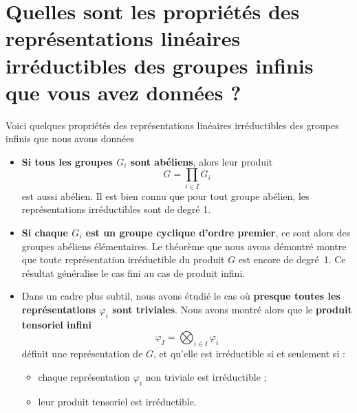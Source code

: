\documentclass[a4paper, 14pt]{report}
\begin{document}
\section{Quelles sont les propriétés des représentations linéaires irréductibles des groupes infinis que vous avez données ?}
Voici quelques propriétés des représentations linéaires irréductibles des groupes infinis que nous avons données
\begin{itemize}
	\item \textbf{Si tous les groupes \( G_i \) sont abéliens}, alors leur produit
	\[
	G = \prod_{i \in I} G_i
	\]
	est aussi abélien. Il est bien connu que pour tout groupe abélien, les représentations irréductibles sont de degré 1.
	
	\item \textbf{Si chaque \( G_i \) est un groupe cyclique d’ordre premier}, ce sont alors des groupes abéliens élémentaires. Le théorème que nous avons démontré montre que toute représentation irréductible du produit \( G \) est encore de degré~1. Ce résultat généralise le cas fini au cas de produit infini.
	
	\item Dans un cadre plus subtil, nous avons étudié le cas où \textbf{presque toutes les représentations \( \varphi_i \) sont triviales}. Nous avons montré alors que le \textbf{produit tensoriel infini}
	\[
	\varphi_I = \bigotimes_{i \in I} \varphi_i
	\]
	définit une représentation de \( G \), et qu’elle est irréductible si et seulement si :
	\begin{itemize}
		\item chaque représentation \( \varphi_i \) non triviale est irréductible ;
		\item leur produit tensoriel est irréductible.
	\end{itemize}
\end{itemize}
\end{document}
